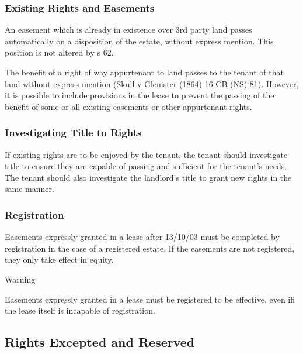 \documentclass[
]{article}
\newenvironment{env-1183acc6-7dc8-44d4-a985-6dec306e67fd}
{
    \savenotes\tcolorbox[blanker,breakable,left=5pt,borderline west={2pt}{-4pt}{orange}]
}
{
    \endtcolorbox\spewnotes
}
\begin{document}
\hypertarget{existing-rights-and-easements}{%
\subsubsection{Existing Rights and
Easements}\label{existing-rights-and-easements}}

An easement which is already in existence over 3rd party land passes
automatically on a disposition of the estate, without express mention.
This position is not altered by s 62.

The benefit of a right of way appurtenant to land passes to the tenant
of that land without express mention (Skull v Glenister (1864) 16 CB
(NS) 81). However, it is possible to include provisions in the lease to
prevent the passing of the benefit of some or all existing easements or
other appurtenant rights.

\hypertarget{investigating-title-to-rights}{%
\subsubsection{Investigating Title to
Rights}\label{investigating-title-to-rights}}

If existing rights are to be enjoyed by the tenant, the tenant should
investigate title to ensure they are capable of passing and sufficient
for the tenant's needs. The tenant should also investigate the
landlord's title to grant new rights in the same manner.

\hypertarget{registration-1}{%
\subsubsection{Registration}\label{registration-1}}

Easements expressly granted in a lease after 13/10/03 must be completed
by registration in the case of a registered estate. If the easements are
not registered, they only take effect in equity.

\begin{env-1183acc6-7dc8-44d4-a985-6dec306e67fd}

Warning

Easements expressly granted in a lease must be registered to be
effective, even ifi the lease itself is incapable of registration.

\end{env-1183acc6-7dc8-44d4-a985-6dec306e67fd}

\hypertarget{rights-excepted-and-reserved}{%
\subsection{Rights Excepted and
Reserved}\label{rights-excepted-and-reserved}}
\end{document}

